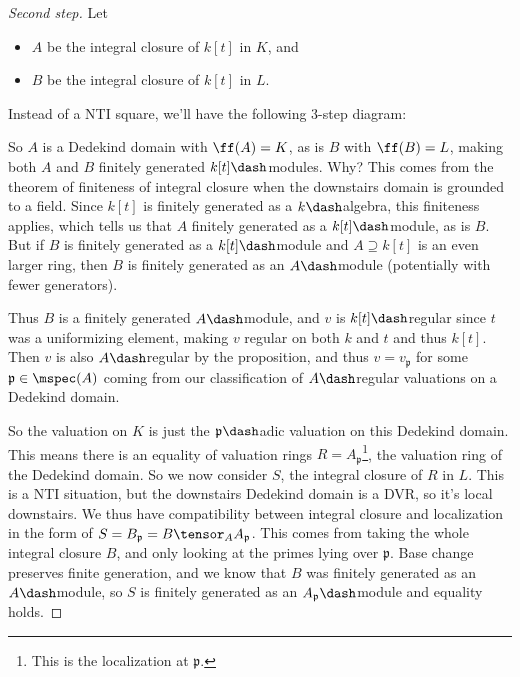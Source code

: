 \begin{proof}[Second step]

Let

\begin{itemize}
\tightlist
\item
  \(A\) be the integral closure of \(k[t]\) in \(K\), and
\item
  \(B\) be the integral closure of \(k[t]\) in \(L\).
\end{itemize}

Instead of a NTI square, we'll have the following 3-step diagram:

\begin{center}\end{center}

So \(A\) is a Dedekind domain with \(\ff(A) = K\), as is \(B\) with
\(\ff(B) = L\), making both \(A\) and \(B\) finitely generated
\(k[t]\dash\)modules. Why? This comes from the theorem of finiteness of
integral closure when the downstairs domain is grounded to a field.
Since \(k[t]\) is finitely generated as a \(k\dash\)algebra, this
finiteness applies, which tells us that \(A\) finitely generated as a
\(k[t]\dash\)module, as is \(B\). But if \(B\) is finitely generated as
a \(k[t]\dash\)module and \(A\supseteq k[t]\) is an even larger ring,
then \(B\) is finitely generated as an \(A\dash\)module (potentially
with fewer generators).

Thus \(B\) is a finitely generated \(A\dash\)module, and \(v\) is
\(k[t]\dash\)regular since \(t\) was a uniformizing element, making
\(v\) regular on both \(k\) and \(t\) and thus \(k[t]\). Then \(v\) is
also \(A\dash\)regular by the proposition, and thus
\(v = v_{\mathfrak{p}}\) for some \(\mathfrak{p}\in \mspec(A)\) coming
from our classification of \(A\dash\)regular valuations on a Dedekind
domain.

So the valuation on \(K\) is just the \(\mathfrak{p}\dash\)adic
valuation on this Dedekind domain. This means there is an equality of
valuation rings \(R = A_{\mathfrak{p}}\)\footnote{This is the
  localization at \(\mathfrak{p}\).}, the valuation ring of the Dedekind
domain. So we now consider \(S\), the integral closure of \(R\) in
\(L\). This is a NTI situation, but the downstairs Dedekind domain is a
DVR, so it's local downstairs. We thus have compatibility between
integral closure and localization in the form of
\(S = B_{\mathfrak{p}} = B \tensor_A A_{\mathfrak{p}}\). This comes from
taking the whole integral closure \(B\), and only looking at the primes
lying over \(\mathfrak{p}\). Base change preserves finite generation,
and we know that \(B\) was finitely generated as an \(A\dash\)module, so
\(S\) is finitely generated as an \(A_{\mathfrak{p}}\dash\)module and
equality holds.

\end{proof}

